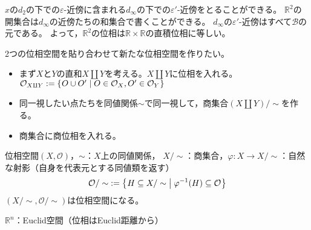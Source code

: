 \documentclass[uplatex]{jsarticle}
\begin{document}
\begin{rei}
  $x$の$d_{2}$の下での$\varepsilon$-近傍に含まれる$d_{\infty}$の下での$\varepsilon'$-近傍をとることができる。
  $\mathbb{R}^{2}$の開集合は$d_{\infty}$の近傍たちの和集合で書くことができる。
  $d_{\infty}$の$\varepsilon'$-近傍はすべて$\mathcal{B}$の元である。
  よって，$\mathbb{R}^{2}$の位相は$\mathbb{R} \times \mathbb{R}$の直積位相に等しい。
\end{rei}

\sukima {}

2つの位相空間を貼り合わせて新たな位相空間を作りたい。

\begin{itemize}
  \vspace{-0.5\baselineskip}
  \item まず$X$と$Y$の直和$X \amalg Y$を考える。$X \amalg Y$に位相を入れる。
  $\mathcal{O}_{X \amalg Y} := \Set{\hspace{-1.8pt} O \cup O' | O \in \mathcal{O}_{X}, O' \in \mathcal{O}_{Y} \hspace{-1.8pt}}$
  \item 同一視したい点たちを同値関係$\sim$で同一視して，商集合$(X \amalg Y) / \sim$を作る。
  \item 商集合に商位相を入れる。
  \vspace{-0.5\baselineskip}
\end{itemize}

位相空間$(X,\mathcal{O})$，$\sim$：$X$上の同値関係，
$X / \sim$：商集合，$\varphi \colon X \longrightarrow X / \sim$：自然な射影（自身を代表元とする同値類を返す）
\begin{equation}
  {\mathcal{O} / \sim} := \Set{\hspace{-1.8pt} H \subseteq {X / \sim} | \varphi^{-1}(H) \subseteq \mathcal{O} \hspace{-1.8pt}}
\end{equation}
$({X / \sim}, {\mathcal{O} / \sim})$は位相空間になる。

\sukima {}

$\mathbb{R}^{n}$：Euclid空間（位相はEuclid距離から）
\end{document}
